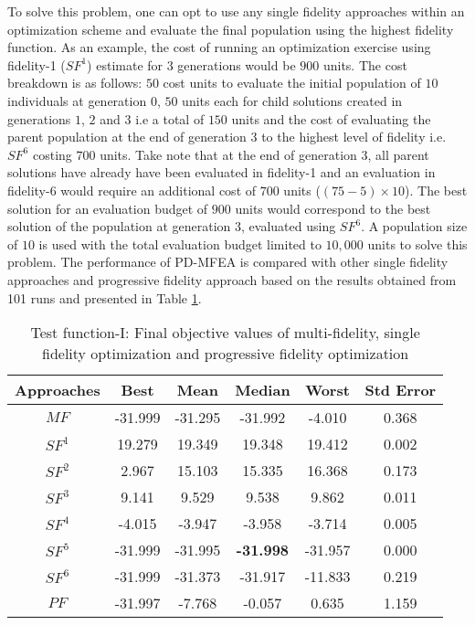 To solve this problem, one can opt to use any single fidelity approaches within an optimization scheme and evaluate the final population using the highest fidelity function. As an example, the cost of running an optimization exercise using fidelity-1 ($SF^1$) estimate for $3$ generations would be $900$ units. The cost breakdown is as follows: $50$ cost units to evaluate the initial population of $10$ individuals at generation $0$, $50$ units each for child solutions created in generations $1$, $2$ and $3$ i.e a total of $150$ units and the cost of evaluating the parent population at the end of generation $3$ to the highest level of fidelity i.e. $SF^6$ costing $700$ units. Take note that at the end of generation 3, all parent solutions have already have been evaluated in fidelity-1 and an evaluation in fidelity-6 would require an additional cost of $700$ units ($(75-5)\times 10$). The best solution for an evaluation budget of $900$ units would correspond to the best solution of the population at generation $3$, evaluated using $SF^6$. A population size of $10$ is used with the total evaluation budget limited to $10,000$ units to solve this problem. The performance of PD-MFEA is compared with other single fidelity approaches and progressive fidelity approach based on the results obtained from 101 runs and presented in Table \ref{tab:test_fn2mod_all}. 

\begin{table}[!htb]\footnotesize
	\caption{Test function-I: Final objective values of multi-fidelity, single fidelity optimization and progressive fidelity optimization}
	\label{tab:test_fn2mod_all}
	\centering
	\begin{tabular}{|c|c|c|c|c|c|}
		\noalign{\smallskip}\hline
		Approaches& Best &Mean & Median & Worst & Std Error\\ \hline
		$MF$&-31.999&-31.295&-31.992&-4.010&0.368\\ \hline
		$SF^1$&19.279&19.349&19.348&19.412&0.002\\ \hline
		$SF^2$&2.967&15.103&15.335&16.368&0.173\\ \hline
		$SF^3$&9.141&9.529&9.538&9.862&0.011\\ \hline
		$SF^4$&-4.015&-3.947&-3.958&-3.714&0.005\\ \hline
		$SF^5$&-31.999&-31.995&\textbf{-31.998}&-31.957&0.000\\ \hline
		$SF^6$&-31.999&-31.373&-31.917&-11.833&0.219\\ \hline
		$PF$&-31.997&-7.768&-0.057&0.635&1.159\\ 
		\hline
	\end{tabular}
\end{table}          

